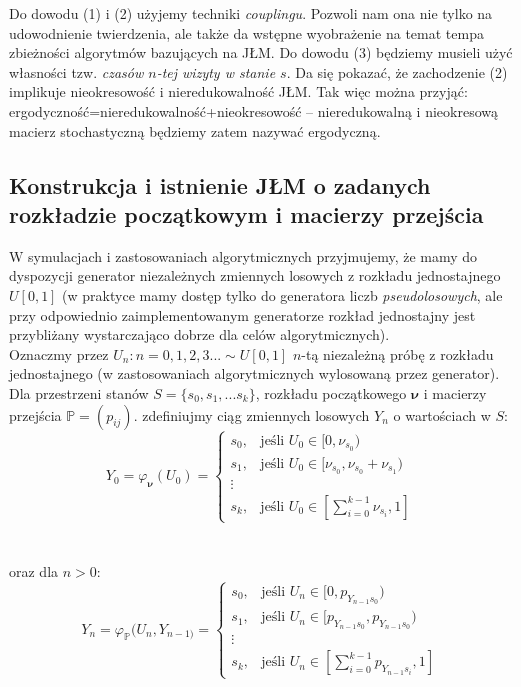 \documentclass[a4paper]{article}
\theoremstyle{defn}
\theoremstyle{theorem}
\theoremstyle{lemma}
\theoremstyle{cor}
\theoremstyle{fact}
\begin{document}
Do dowodu (1) i (2) użyjemy techniki \textit{couplingu}. Pozwoli nam ona nie tylko na udowodnienie twierdzenia, ale także da wstępne wyobrażenie na temat tempa zbieżności algorytmów bazujących na JŁM. Do dowodu (3) będziemy musieli użyć własności tzw. \textit{czasów $n$-tej wizyty w stanie $s$}. Da się pokazać, że zachodzenie (2) implikuje nieokresowość i nieredukowalność JŁM. Tak więc można przyjąć: ergodyczność=nieredukowalność+nieokresowość – nieredukowalną i nieokresową macierz stochastyczną będziemy zatem nazywać ergodyczną.

\subsection{Konstrukcja i istnienie JŁM o zadanych rozkładzie początkowym i macierzy przejścia}
\label{sect2.3}
W symulacjach i zastosowaniach algorytmicznych przyjmujemy, że mamy do dyspozycji generator niezależnych zmiennych losowych z rozkładu jednostajnego $U[0,1]$ (w praktyce mamy dostęp tylko do generatora liczb \textit{pseudolosowych}, ale przy odpowiednio zaimplementowanym generatorze rozkład jednostajny jest przybliżany wystarczająco dobrze dla celów algorytmicznych). \\
Oznaczmy przez $U_n : n = 0,1,2,3... \sim U[0,1]$ $n$-tą niezależną próbę z rozkładu jednostajnego (w zastosowaniach algorytmicznych wylosowaną przez generator). Dla przestrzeni stanów $S = \{s_0, s_1, ... s_k\}$, rozkładu początkowego $\boldsymbol{\nu}$ i macierzy przejścia $\mathbb{P} = (p_{ij})$. zdefiniujmy ciąg zmiennych losowych $Y_n$  o wartościach w $S$:
    $$Y_0 = \varphi_{\boldsymbol{\nu}}(U_0) =
    \begin{cases}
      s_0, & \text{jeśli } U_0 \in [0, \nu_{s_0}) \\
      s_1, & \text{jeśli } U_0 \in [\nu_{s_0}, \nu_{s_0}+\nu_{s_1}) \\
      \vdots \\
      s_k, & \text{jeśli } U_0 \in [\sum\limits_{i=0}^{k-1} \nu_{s_i}, 1]
    \end{cases}$$\\
    \\oraz dla $n > 0$: $$Y_n= \varphi_{\mathbb{P}}(U_n, Y_{n-1)} =
    \begin{cases}
      s_0, & \text{jeśli } U_n \in [0, p_{Y_{n-1} s_0}) \\
      s_1, & \text{jeśli } U_n \in [p_{Y_{n-1} s_0}, p_{Y_{n-1} s_0}) \\
      \vdots \\
      s_k, & \text{jeśli } U_n \in [\sum\limits_{i=0}^{k-1} p_{Y_{n-1} s_i}, 1]
    \end{cases}$$
\end{document}
